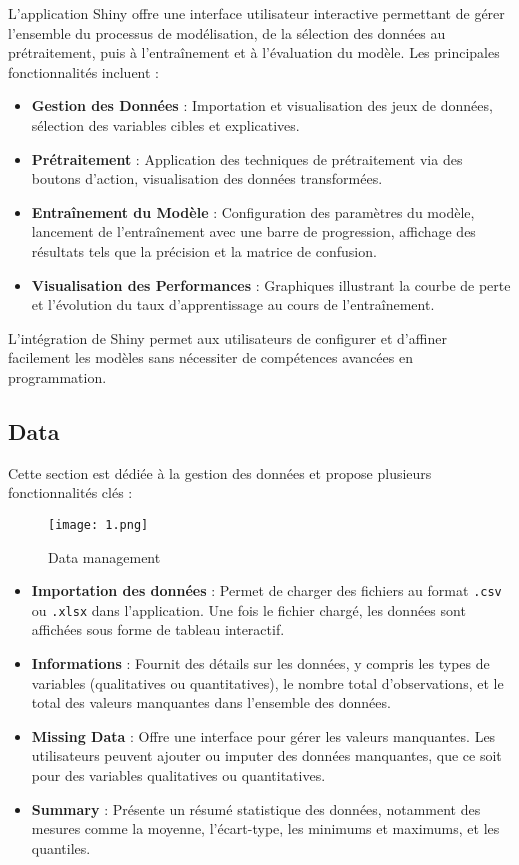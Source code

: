\documentclass[a4paper,12pt]{article}
\begin{document}
L'application Shiny offre une interface utilisateur interactive permettant de gérer l'ensemble du processus de modélisation, de la sélection des données au prétraitement, puis à l'entraînement et à l'évaluation du modèle. Les principales fonctionnalités incluent :

\begin{itemize}
    \item \textbf{Gestion des Données} : Importation et visualisation des jeux de données, sélection des variables cibles et explicatives.
    \item \textbf{Prétraitement} : Application des techniques de prétraitement via des boutons d'action, visualisation des données transformées.
    \item \textbf{Entraînement du Modèle} : Configuration des paramètres du modèle, lancement de l'entraînement avec une barre de progression, affichage des résultats tels que la précision et la matrice de confusion.
    \item \textbf{Visualisation des Performances} : Graphiques illustrant la courbe de perte et l'évolution du taux d'apprentissage au cours de l'entraînement.
\end{itemize}

L'intégration de Shiny permet aux utilisateurs de configurer et d'affiner facilement les modèles sans nécessiter de compétences avancées en programmation.


\subsection{Data}
Cette section est dédiée à la gestion des données et propose plusieurs fonctionnalités clés :

\begin{figure}[h!]
    \centering
    \texttt{[image: 1.png]}
    \caption{Data management}
    \label{fig:enter-label}
\end{figure}
\begin{itemize}
    \item \textbf{Importation des données} : Permet de charger des fichiers au format \texttt{.csv} ou \texttt{.xlsx} dans l'application. Une fois le fichier chargé, les données sont affichées sous forme de tableau interactif.
    \item \textbf{Informations} : Fournit des détails sur les données, y compris les types de variables (qualitatives ou quantitatives), le nombre total d'observations, et le total des valeurs manquantes dans l'ensemble des données.
    \item \textbf{Missing Data} : Offre une interface pour gérer les valeurs manquantes. Les utilisateurs peuvent ajouter ou imputer des données manquantes, que ce soit pour des variables qualitatives ou quantitatives.
    \item \textbf{Summary} : Présente un résumé statistique des données, notamment des mesures comme la moyenne, l'écart-type, les minimums et maximums, et les quantiles.
\end{itemize}
\end{document}
